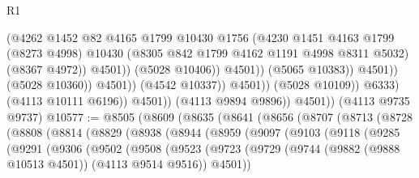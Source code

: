 \begin{lexlean}{R1}
\begin{coremodule}
                                              (@4262
                                                @1452
                                                @82
                                                @4165
                                                @1799
                                                @10430
                                                @1756
                                                (@4230
                                                  @1451
                                                  @4163
                                                  @1799
                                                  (@8273 @4998)
                                                  @10430
                                                  (@8305 @842 @1799 @4162 @1191 @4998 @8311 @5032)
                                                  (@8367 @4972))
                                                @4501))
                                            (@5028 @10406))
                                          @4501))
                                      (@5065 @10383))
                                    @4501))
                                (@5028 @10360))
                              @4501))
                          (@4542 @10337))
                        @4501))
                    (@5028 @10109))
                  @6333)
                (@4113 @10111 @6196))
              @4501))
          (@4113 @9894 @9896))
        @4501))
    (@4113 @9735 @9737)
@10577 := @8505
    (@8609
      (@8635
        (@8641
          (@8656
            (@8707
              (@8713
                (@8728
                  (@8808
                    (@8814
                      (@8829
                        (@8938
                          (@8944
                            (@8959
                              (@9097
                                (@9103
                                  (@9118
                                    (@9285
                                      (@9291
                                        (@9306
                                          (@9502
                                            (@9508
                                              (@9523
                                                (@9723
                                                  (@9729
                                                    (@9744
                                                      (@9882 (@9888 @10513 @4501))
                                                      (@4113 @9514 @9516))
                                                    @4501))

\end{coremodule}
\end{lexlean}
